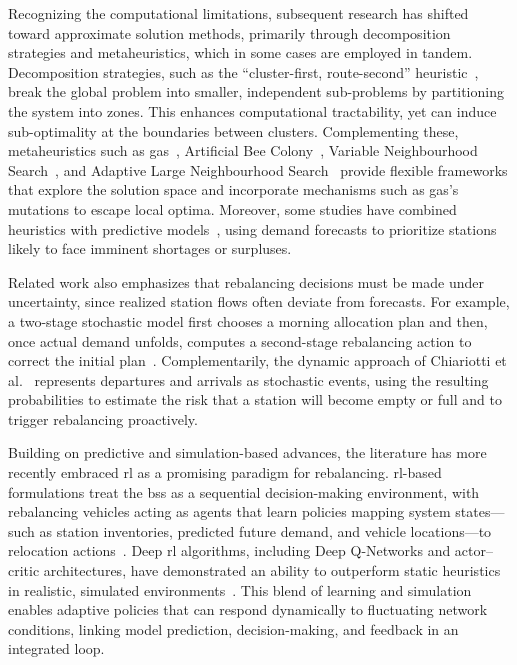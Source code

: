     Recognizing the computational limitations, subsequent research has shifted toward approximate solution methods, primarily through decomposition strategies and metaheuristics, which in some cases are employed in tandem. Decomposition strategies, such as the ``cluster-first, route-second'' heuristic~\cite{Schuijbroek2017}, break the global problem into smaller, independent sub-problems by partitioning the system into zones. This enhances computational tractability, yet can induce sub-optimality at the boundaries between clusters. Complementing these, metaheuristics such as \acp{ga}~\cite{Li2016_Multiple}, Artificial Bee Colony~\cite{Shui2018}, Variable Neighbourhood Search~\cite{Kloimullner2014, Raidl2013}, and Adaptive Large Neighbourhood Search~\cite{Liu2025} provide flexible frameworks that explore the solution space and incorporate mechanisms such as \acp{ga}'s mutations to escape local optima. Moreover, some studies have combined heuristics with predictive models~\cite{He2021}, using demand forecasts to prioritize stations likely to face imminent shortages or surpluses. 
    
    Related work also emphasizes that rebalancing decisions must be made under uncertainty, since realized station flows often deviate from forecasts. For example, a two-stage stochastic model first chooses a morning allocation plan and then, once actual demand unfolds, computes a second-stage rebalancing action to correct the initial plan~\cite{Cavagnini2018}. Complementarily, the dynamic approach of Chiariotti et al.~\cite{Chiariotti2018} represents departures and arrivals as stochastic events, using the resulting probabilities to estimate the risk that a station will become empty or full and to trigger rebalancing proactively.

    Building on predictive and simulation-based advances, the literature has more recently embraced \ac{rl} as a promising paradigm for rebalancing. \ac{rl}-based formulations treat the \ac{bss} as a sequential decision-making environment, with rebalancing vehicles acting as agents that learn policies mapping system states—such as station inventories, predicted future demand, and vehicle locations—to relocation actions~\cite{Yin2024}. Deep \ac{rl} algorithms, including Deep Q-Networks and actor--critic architectures, have demonstrated an ability to outperform static heuristics in realistic, simulated environments~\cite{Yin2024, Liang2025}. This blend of learning and simulation enables adaptive policies that can respond dynamically to fluctuating network conditions, linking model prediction, decision-making, and feedback in an integrated loop.


